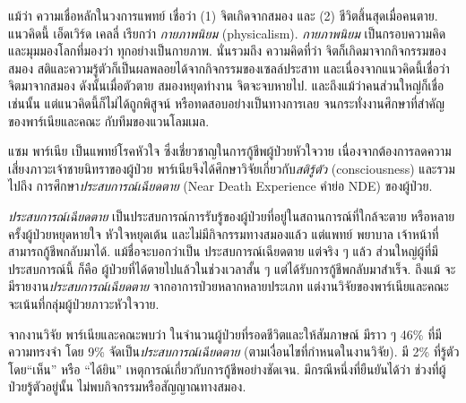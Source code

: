 {\begin{shaded}
		แม้ว่า ความเชื่อหลักในวงการแพทย์ เชื่อว่า (1) จิตเกิดจากสมอง และ (2) ชีวิตสิ้นสุดเมื่อคนตาย.
		แนวคิดนี้ เอ็ดเวิร์ด เคลลี่\cite{Kelly2016a} เรียกว่า \textit{กายภาพนิยม} (physicalism).
		\textit{กายภาพนิยม} เป็นกรอบความคิด และมุมมองโลกที่มองว่า ทุกอย่างเป็นกายภาพ.
		นั่นรวมถึง ความคิดที่ว่า จิตก็เกิดมาจากกิจกรรมของสมอง สติและความรู้ตัวก็เป็นผลพลอยได้จากกิจกรรมของเซลล์ประสาท
		และเนื่องจากแนวคิดนี้เชื่อว่า จิตมาจากสมอง ดังนั้นเมื่อตัวตาย สมองหยุดทำงาน จิตจะจบหายไป.
		และถึงแม้ว่าคนส่วนใหญ่ก็เชื่อเช่นนั้น แต่แนวคิดนี้ก็ไม่ได้ถูกพิสูจน์ 
		หรือทดสอบอย่างเป็นทางการเลย
		จนกระทั่งงานศึกษาที่สำคัญของพาร์เนียและคณะ\cite{ParniaEtAl2001a} กับทีมของแวนโลมเมล\cite{vanLommelEtAl2001a}.
		
		แซม พาร์เนีย เป็นแพทย์โรคหัวใจ ซึ่งเชี่ยวชาญในการกู้ชีพผู้ป่วยหัวใจวาย 
		เนื่องจากต้องการลดความเสี่ยงภาวะเจ้าชายนิทราของผู้ป่วย 
		พาร์เนียจึงได้ศึกษาวิจัยเกี่ยวกับ\textit{สติรู้ตัว} (consciousness) และรวมไปถึง
		การศึกษา\textit{ประสบการณ์เฉียดตาย} (Near Death Experience คำย่อ NDE) ของผู้ป่วย.
		
		\textit{ประสบการณ์เฉียดตาย} เป็นประสบการณ์การรับรู้ของผู้ป่วยที่อยู่ในสถานการณ์ที่ใกล้จะตาย หรือหลายครั้งผู้ป่วยหยุดหายใจ หัวใจหยุดเต้น และไม่มีกิจกรรมทางสมองแล้ว แต่แพทย์ พยาบาล เจ้าหน้าที่ สามารถกู้ชีพกลับมาได้.
		แม้ชื่อจะบอกว่าเป็น ประสบการณ์เฉียดตาย 
		แต่จริง ๆ แล้ว ส่วนใหญ่ผู้ที่มีประสบการณ์นี้ ก็คือ ผู้ป่วยที่ได้ตายไปแล้วในช่วงเวลาสั้น ๆ แต่ได้รับการกู้ชีพกลับมาสำเร็จ.
		ถึงแม้ จะมีรายงาน\textit{ประสบการณ์เฉียดตาย} จากอาการป่วยหลากหลายประเภท แต่งานวิจัยของพาร์เนียและคณะจะเน้นที่กลุ่มผู้ป่วยภาวะหัวใจวาย.
		
		จากงานวิจัย\cite{ParniaEtAl2014a} พาร์เนียและคณะพบว่า
		ในจำนวนผู้ป่วยที่รอดชีวิตและให้สัมภาษณ์ มีราว ๆ 46\% ที่มีความทรงจำ
		โดย 9\%  จัดเป็น\textit{ประสบการณ์เฉียดตาย} (ตามเงื่อนไขที่กำหนดในงานวิจัย).
		มี 2\% ที่รู้ตัว โดย``เห็น'' หรือ ``ได้ยิน'' เหตุการณ์เกี่ยวกับการกู้ชีพอย่างชัดเจน.
		มีกรณีหนึ่งที่ยืนยันได้ว่า ช่วงที่ผู้ป่วยรู้ตัวอยู่นั้น ไม่พบกิจกรรมหรือสัญญาณทางสมอง.
		

\end{shaded}}
